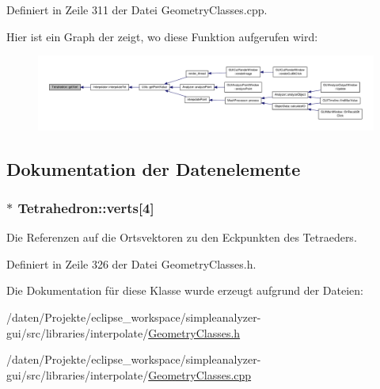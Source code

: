 Definiert in Zeile 311 der Datei Geometry\-Classes.\-cpp.



Hier ist ein Graph der zeigt, wo diese Funktion aufgerufen wird\-:\nopagebreak
\begin{figure}[H]
\begin{center}
\leavevmode
\includegraphics[width=350pt]{classTetrahedron_a88afe41ae5991168ad51ba4dbb2e1a6b_icgraph}
\end{center}
\end{figure}




\subsection{Dokumentation der Datenelemente}
\hypertarget{classTetrahedron_a4bb7ad83965859998a622b35a97ad935}{
\subsubsection[{verts}]{$\ast$ Tetrahedron\-::verts\mbox{[}4\mbox{]}\hspace{0.3cm}{\ttfamily [private]}}}\label{classTetrahedron_a4bb7ad83965859998a622b35a97ad935}


Die Referenzen auf die Ortsvektoren zu den Eckpunkten des Tetraeders. 



Definiert in Zeile 326 der Datei Geometry\-Classes.\-h.



Die Dokumentation für diese Klasse wurde erzeugt aufgrund der Dateien\-:\begin{DoxyCompactItemize}
\item 
/daten/\-Projekte/eclipse\-\_\-workspace/simpleanalyzer-\/gui/src/libraries/interpolate/\hyperlink{GeometryClasses_8h}{Geometry\-Classes.\-h}\item 
/daten/\-Projekte/eclipse\-\_\-workspace/simpleanalyzer-\/gui/src/libraries/interpolate/\hyperlink{GeometryClasses_8cpp}{Geometry\-Classes.\-cpp}\end{DoxyCompactItemize}
